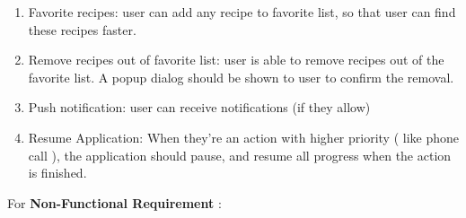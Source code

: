 \documentclass{article}
\begin{document}
\begin{enumerate}
        \item Favorite recipes: user can add any recipe to favorite list, so that user can find these recipes faster.
        \item Remove recipes out of favorite list: user is able to remove recipes out of the favorite list. A popup dialog should be shown to user to confirm the removal.
        \item Push notification: user can receive notifications (if they allow)
        \item Resume Application: When they're an action with higher priority ( like phone call ), the application should pause, and resume all progress when the action is finished.
    \end{enumerate}

    For \textbf{ Non-Functional Requirement} :   \\
\end{document}
